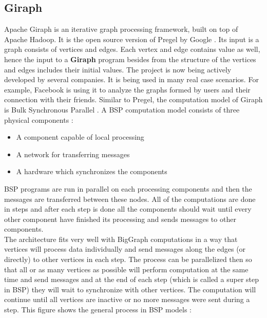 \documentclass[english]{tktltiki}
\begin{document}
\subsection{Giraph}
Apache Giraph is an iterative graph processing framework, built on top of Apache Hadoop. It is the open source version of Pregel by Google \cite{malewicz10} . Its input is a graph consists of vertices and edges. Each vertex and edge contains value as well, hence the input to a \textbf{Giraph} program besides from the structure of the vertices and edges includes their initial values. The project is now being actively developed by several companies. It is being used in many real case scenarios. For example, Facebook is using it to analyze the graphs formed by users and their connection with their friends. Similar to Pregel, the computation model of Giraph is Bulk Synchronous Parallel \cite{valiant90}. A BSP computation model consists of three physical components : 
\begin{itemize}
\item
A component capable of local processing
\item
A network for transferring messages
\item
A hardware which synchronizes the components
\end{itemize}
BSP programs are run in parallel on each processing components and then the messages are transferred between these nodes. All of the computations are done in steps and after each step is done all the components should wait until every other component have finished its processing and sends messages to other components. \\
The architecture fits very well with BigGraph computations in a way that vertices will process data individually and send messages along the edges (or directly) to other vertices in each step. The process can be parallelized then so that all or as many vertices as possible will perform computation at the same time and send messages and at the end of each step (which is called a super step in BSP) they will wait to synchronize with other vertices. 
The computation will continue until all vertices are inactive or no more messages were sent during a step. This figure shows the general process in BSP models : 
\end{document}
